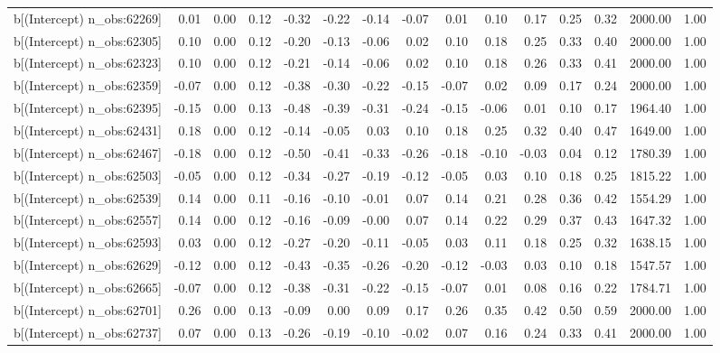 \begin{table}[ht]
\begin{tabular}{rrrrrrrrrrrrrrr}
  b[(Intercept) n\_obs:62269] & 0.01 & 0.00 & 0.12 & -0.32 & -0.22 & -0.14 & -0.07 & 0.01 & 0.10 & 0.17 & 0.25 & 0.32 & 2000.00 & 1.00 \\ 
  b[(Intercept) n\_obs:62305] & 0.10 & 0.00 & 0.12 & -0.20 & -0.13 & -0.06 & 0.02 & 0.10 & 0.18 & 0.25 & 0.33 & 0.40 & 2000.00 & 1.00 \\ 
  b[(Intercept) n\_obs:62323] & 0.10 & 0.00 & 0.12 & -0.21 & -0.14 & -0.06 & 0.02 & 0.10 & 0.18 & 0.26 & 0.33 & 0.41 & 2000.00 & 1.00 \\ 
  b[(Intercept) n\_obs:62359] & -0.07 & 0.00 & 0.12 & -0.38 & -0.30 & -0.22 & -0.15 & -0.07 & 0.02 & 0.09 & 0.17 & 0.24 & 2000.00 & 1.00 \\ 
  b[(Intercept) n\_obs:62395] & -0.15 & 0.00 & 0.13 & -0.48 & -0.39 & -0.31 & -0.24 & -0.15 & -0.06 & 0.01 & 0.10 & 0.17 & 1964.40 & 1.00 \\ 
  b[(Intercept) n\_obs:62431] & 0.18 & 0.00 & 0.12 & -0.14 & -0.05 & 0.03 & 0.10 & 0.18 & 0.25 & 0.32 & 0.40 & 0.47 & 1649.00 & 1.00 \\ 
  b[(Intercept) n\_obs:62467] & -0.18 & 0.00 & 0.12 & -0.50 & -0.41 & -0.33 & -0.26 & -0.18 & -0.10 & -0.03 & 0.04 & 0.12 & 1780.39 & 1.00 \\ 
  b[(Intercept) n\_obs:62503] & -0.05 & 0.00 & 0.12 & -0.34 & -0.27 & -0.19 & -0.12 & -0.05 & 0.03 & 0.10 & 0.18 & 0.25 & 1815.22 & 1.00 \\ 
  b[(Intercept) n\_obs:62539] & 0.14 & 0.00 & 0.11 & -0.16 & -0.10 & -0.01 & 0.07 & 0.14 & 0.21 & 0.28 & 0.36 & 0.42 & 1554.29 & 1.00 \\ 
  b[(Intercept) n\_obs:62557] & 0.14 & 0.00 & 0.12 & -0.16 & -0.09 & -0.00 & 0.07 & 0.14 & 0.22 & 0.29 & 0.37 & 0.43 & 1647.32 & 1.00 \\ 
  b[(Intercept) n\_obs:62593] & 0.03 & 0.00 & 0.12 & -0.27 & -0.20 & -0.11 & -0.05 & 0.03 & 0.11 & 0.18 & 0.25 & 0.32 & 1638.15 & 1.00 \\ 
  b[(Intercept) n\_obs:62629] & -0.12 & 0.00 & 0.12 & -0.43 & -0.35 & -0.26 & -0.20 & -0.12 & -0.03 & 0.03 & 0.10 & 0.18 & 1547.57 & 1.00 \\ 
  b[(Intercept) n\_obs:62665] & -0.07 & 0.00 & 0.12 & -0.38 & -0.31 & -0.22 & -0.15 & -0.07 & 0.01 & 0.08 & 0.16 & 0.22 & 1784.71 & 1.00 \\ 
  b[(Intercept) n\_obs:62701] & 0.26 & 0.00 & 0.13 & -0.09 & 0.00 & 0.09 & 0.17 & 0.26 & 0.35 & 0.42 & 0.50 & 0.59 & 2000.00 & 1.00 \\ 
  b[(Intercept) n\_obs:62737] & 0.07 & 0.00 & 0.13 & -0.26 & -0.19 & -0.10 & -0.02 & 0.07 & 0.16 & 0.24 & 0.33 & 0.41 & 2000.00 & 1.00 \\ 

\end{tabular}
\end{table}
